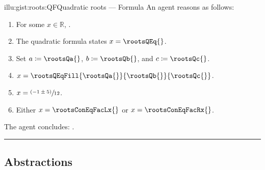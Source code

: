 \documentclass[10pt]{article}
\begin{document}
\begin{note}
\begin{minipage}{.5\linewidth}
\begin{rscenariox}{illu:gist:roots:QF}{Quadratic roots --- Formula}
      An agent reasons as follows:
      \begin{enumerate}[label=\arabic*., ref=\arabic*]
      \item
        \label{illu:gist:roots:QF:eq}
        For some \(x \in \mathbb{R}\), \rootsConEq{}.
      \item
        \label{illu:gist:roots:QF:qf}
        The quadratic formula states \(x = \rootsQEq{}\).
      \item
        \label{illu:gist:roots:QF:subs}
        Set \(a \coloneq \rootsQa{}\), \(b \coloneq \rootsQb{}\), and \(c \coloneq \rootsQc{}\).%
      \item
        \label{illu:gist:roots:QF:qf-subs}
        \(x = \rootsQEqFill{\rootsQa{}}{\rootsQb{}}{\rootsQc{}}\).
      \item
        \label{illu:gist:roots:QF:qf:1}
        \(x = \sfrac{(- 1 \pm 5)}{12}\).
      \item
        \label{illu:gist:roots:QF:qf:done}
        Either \(x = \rootsConEqFacLx{}\) or \(x = \rootsConEqFacRx{}\).
      \end{enumerate}
      The agent concludes:
      \rootsCon{}.
    \end{rscenariox}
  \end{minipage}
  \par\noindent\rule{\textwidth}{0.4pt}
\end{note}




\subsection{Abstractions}
\end{document}
